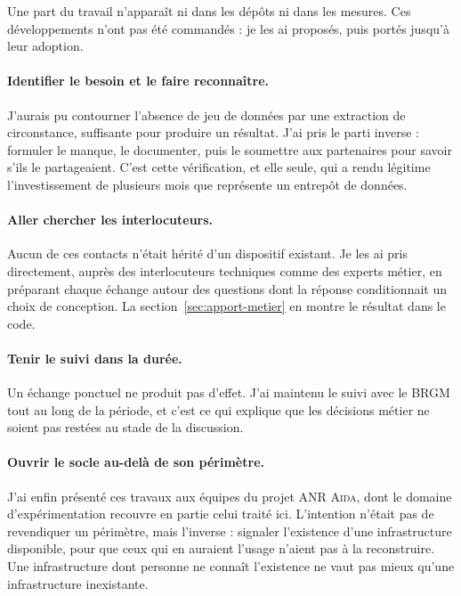 Une part du travail n'apparaît ni dans les dépôts ni dans les mesures. Ces développements
n'ont pas été commandés : je les ai proposés, puis portés jusqu'à leur adoption.

\paragraph{Identifier le besoin et le faire reconnaître.} J'aurais pu contourner l'absence de jeu
de données par une extraction de circonstance, suffisante pour produire un résultat. J'ai pris le
parti inverse : formuler le manque, le documenter, puis le soumettre aux partenaires pour savoir
s'ils le partageaient. C'est cette vérification, et elle seule, qui a rendu légitime
l'investissement de plusieurs mois que représente un entrepôt de données.

\paragraph{Aller chercher les interlocuteurs.} Aucun de ces contacts n'était hérité d'un
dispositif existant. Je les ai pris directement, auprès des interlocuteurs techniques comme des
experts métier, en préparant chaque échange autour des questions dont la réponse conditionnait un
choix de conception. La section~\ref{sec:apport-metier} en montre le résultat dans le code.

\paragraph{Tenir le suivi dans la durée.} Un échange ponctuel ne produit pas d'effet. J'ai
maintenu le suivi avec le BRGM tout au long de la période, et c'est ce qui explique que les
décisions métier ne soient pas restées au stade de la discussion.

\paragraph{Ouvrir le socle au-delà de son périmètre.} J'ai enfin présenté ces travaux aux équipes
du projet ANR \textsc{Aida}, dont le domaine d'expérimentation recouvre en partie celui traité
ici. L'intention n'était pas de revendiquer un périmètre, mais l'inverse : signaler l'existence
d'une infrastructure disponible, pour que ceux qui en auraient l'usage n'aient pas à la
reconstruire. Une infrastructure dont personne ne connaît l'existence ne vaut pas mieux qu'une
infrastructure inexistante.

